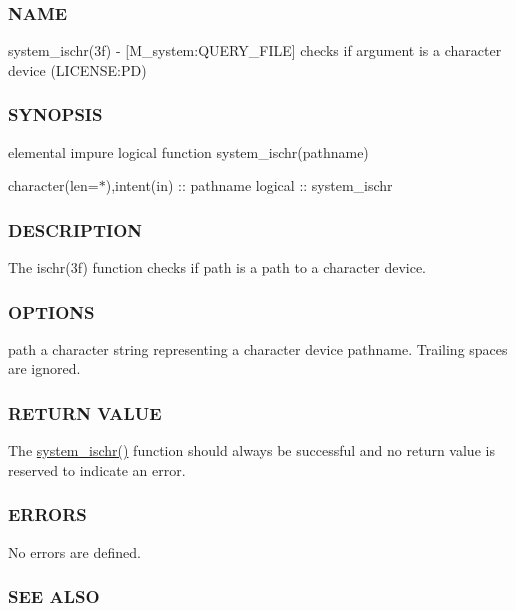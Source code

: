 \subsubsection*{N\+A\+ME}

system\+\_\+ischr(3f) -\/ \mbox{[}M\+\_\+system\+:Q\+U\+E\+R\+Y\+\_\+\+F\+I\+LE\mbox{]} checks if argument is a character device (L\+I\+C\+E\+N\+SE\+:PD) 

\subsubsection*{S\+Y\+N\+O\+P\+S\+IS}

elemental impure logical function system\+\_\+ischr(pathname)

character(len=$\ast$),intent(in) \+:\+: pathname logical \+:\+: system\+\_\+ischr

\subsubsection*{D\+E\+S\+C\+R\+I\+P\+T\+I\+ON}

The ischr(3f) function checks if path is a path to a character device.

\subsubsection*{O\+P\+T\+I\+O\+NS}

path a character string representing a character device pathname. Trailing spaces are ignored.

\subsubsection*{R\+E\+T\+U\+RN V\+A\+L\+UE}

The \mbox{\hyperlink{namespacem__system_a49f1d027d438aab86024660b0802768f}{system\+\_\+ischr()}} function should always be successful and no return value is reserved to indicate an error.

\subsubsection*{E\+R\+R\+O\+RS}

No errors are defined.

\subsubsection*{S\+EE A\+L\+SO}

